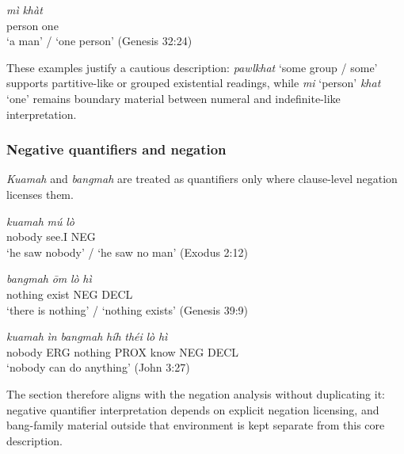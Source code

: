 \documentclass[
  11pt,
  a4paper,
]{article}
\newcommand{\tdim}[1]{\textit{#1}}
\newcommand{\tdimword}[1]{\textit{#1}}
\renewcommand{\textsc}[1]{{\footnotesize\MakeUppercase{#1}}}
\newcommand{\glossquote}[1]{`#1'}
\begin{document}
\begin{exe}
\ex \label{ex:quant-mi-khat}
\gll \tdimword{mì} \tdimword{khàt} \\
     person one \\
\glt \glossquote{a man} / \glossquote{one person} (Genesis 32:24)
\end{exe}

These examples justify a cautious description: \tdim{pawlkhat}
\glossquote{some group / some} supports partitive-like or grouped
existential readings, while \tdim{mi} \glossquote{person} \tdim{khat}
\glossquote{one} remains boundary material between numeral and
indefinite-like interpretation.

\subsubsection{Negative quantifiers and
negation}\label{negative-quantifiers-and-negation}

\tdim{Kuamah} and \tdim{bangmah} are treated as quantifiers only where
clause-level negation licenses them.

\begin{exe}
\ex \label{ex:quant-kuamah}
\gll \tdimword{kuamah} \tdimword{mú} \tdimword{lò} \\
     nobody see.\textsc{i} \textsc{neg} \\
\glt \glossquote{he saw nobody} / \glossquote{he saw no man} (Exodus 2:12)
\end{exe}

\begin{exe}
\ex \label{ex:quant-bangmah}
\gll \tdimword{bangmah} \tdimword{ōm} \tdimword{lò} \tdimword{hì} \\
     nothing exist \textsc{neg} \textsc{decl} \\
\glt \glossquote{there is nothing} / \glossquote{nothing exists} (Genesis 39:9)
\end{exe}

\begin{exe}
\ex \label{ex:quant-kuamah-bangmah}
\gll \tdimword{kuamah} \tdimword{ìn} \tdimword{bangmah} \tdimword{híh} \tdimword{théi} \tdimword{lò} \tdimword{hì} \\
     nobody \textsc{erg} nothing \textsc{prox} know \textsc{neg} \textsc{decl} \\
\glt \glossquote{nobody can do anything} (John 3:27)
\end{exe}

The section therefore aligns with the negation analysis without
duplicating it: negative quantifier interpretation depends on explicit
negation licensing, and bang-family material outside that environment is
kept separate from this core description.
\end{document}
